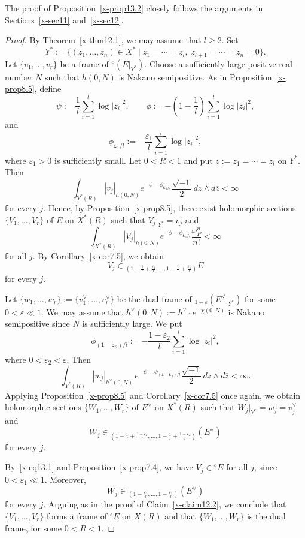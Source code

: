 \documentclass[12pt,twoside]{amsart}
\theoremstyle{definition}
\begin{document}
The proof of Proposition~\ref{x-prop13.2} closely follows the arguments
in Sections~\ref{x-sec11} and~\ref{x-sec12}.

\begin{proof}
By Theorem~\ref{x-thm12.1}, we may assume that $l\ge2$.
Set
\[
Y^*
:=\{(z_1,\ldots,z_n)\in X^* \mid
z_1=\cdots=z_l,\; z_{l+1}=\cdots=z_n=0\}.
\]
Let $\{v_1,\ldots,v_r\}$ be a frame of ${}^\diamond\!(E|_{Y^*})$.
Choose a sufficiently large positive real number $N$ such that
$h(0,N)$ is Nakano semipositive.
As in Proposition~\ref{x-prop8.5}, define
\[
\psi:=\frac{1}{l}\sum_{i=1}^l \log|z_i|^2,\qquad
\phi:=-\left(1-\frac{1}{l}\right)\sum_{i=1}^l \log|z_i|^2,
\]
and
\[
\phi_{\bm\varepsilon_1/l}
:=-\frac{\varepsilon_1}{l}\sum_{i=1}^l \log|z_i|^2,
\]
where $\varepsilon_1>0$ is sufficiently small.
Let $0<R<1$ and put $z:=z_1=\cdots=z_l$ on $Y^*$.
Then
\[
\int_{Y^*(R)} |v_j|_{h(0,N)}
e^{-\psi-\phi_{\bm\varepsilon_1/l}}
\frac{\sqrt{-1}}{2}\,dz\wedge d\overline z
<\infty
\]
for every $j$.
Hence, by Proposition~\ref{x-prop8.5}, there exist holomorphic sections
$\{V_1,\ldots,V_r\}$ of $E$ on $X^*(R)$ such that
$V_j|_{Y^*}=v_j$ and
\[
\int_{X^*(R)} |V_j|_{h(0,N)}
e^{-\phi-\phi_{\bm\varepsilon_1/l}}
\frac{\omega_P^n}{n!}
<\infty
\]
for all $j$.
By Corollary~\ref{x-cor7.5}, we obtain
\[
V_j\in {}_{\left(1-\frac{1}{l}+\frac{\varepsilon_1}{l},\ldots,
1-\frac{1}{l}+\frac{\varepsilon_1}{l}\right)}E
\]
for every $j$. 

Let $\{w_1,\ldots,w_r\} := \{v_1^\vee,\ldots,v_r^\vee\}$ be 
the dual frame of
${}_{1-\varepsilon}(E^\vee|_{Y^*})$ for some $0<\varepsilon\ll1$. 
We may assume that
$h^\vee(0,N) := h^\vee \cdot e^{-\chi(0,N)}$ is Nakano semipositive since $N$ is sufficiently large.
We put
\[
\phi_{(\bm 1-\bm \varepsilon_2)/l} := -\frac{1-\varepsilon_2}{l}
\sum_{i=1}^l
\log |z_i|^2,
\]
where $0<\varepsilon_2<\varepsilon$.
Then
\[
\int_{Y^*(R)} |w_j|_{h^\vee(0,N)}\,
e^{-\psi-\phi_{(\bm 1-\bm \varepsilon_2)/l}}
\frac{\sqrt{-1}}{2}\,dz\wedge d\overline z < \infty.
\]
Applying Proposition~\ref{x-prop8.5} and Corollary~\ref{x-cor7.5} 
once again,
we obtain holomorphic sections $\{W_1,\ldots,W_r\}$ of $E^\vee$ on $X^*(R)$
such that $W_j|_{Y^*}=w_j=v_j^\vee$ and
\[
W_j \in {}_{\left(1-\frac{1}{l}+\frac{1-\varepsilon_2}{l},\ldots,
1-\frac{1}{l}+\frac{1-\varepsilon_2}{l}\right)}(E^\vee)
\]
for every $j$.

By~\eqref{x-eq13.1} and Proposition~\ref{x-prop7.4}, we have
$V_j\in {}^\diamond\!E$ for all $j$, since $0<\varepsilon_1\ll1$.
Moreover,
\[
W_j\in {}_{\left(1-\frac{\varepsilon_2}{l},\ldots,
1-\frac{\varepsilon_2}{l}\right)}(E^\vee)
\]
for every $j$.
Arguing as in the proof of Claim~\ref{x-claim12.2}, we conclude that
$\{V_1,\ldots,V_r\}$ forms a frame of ${}^\diamond\!E$ on $X(R)$ and that
$\{W_1,\ldots,W_r\}$ is the dual frame, for some $0<R<1$.
\end{proof}
\end{document}

